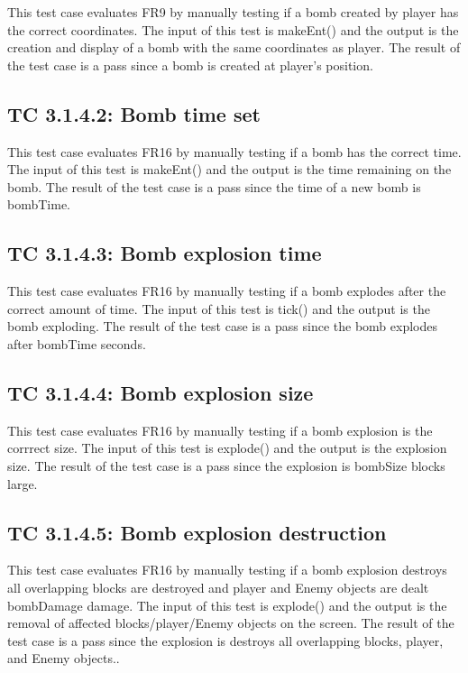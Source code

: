 \documentclass[12pt, titlepage]{article}
\begin{document}
This test case evaluates FR9 by manually testing if a bomb created by player has the correct coordinates. The input of this test is makeEnt() and the output is the creation and display of a bomb with the same coordinates as player. The result of the test case is a pass since a bomb is created at player's position. 

\subsection*{TC 3.1.4.2: Bomb time set}

This test case evaluates FR16 by manually testing if a bomb has the correct time. The input of this test is makeEnt() and the output is the time remaining on the bomb. The result of the test case is a pass since the time of a new bomb is bombTime. 

\subsection*{TC 3.1.4.3: Bomb explosion time}

This test case evaluates FR16 by manually testing if a bomb explodes after the correct amount of time. The input of this test is tick() and the output is the bomb exploding. The result of the test case is a pass since the bomb explodes after bombTime seconds. 

\subsection*{TC 3.1.4.4: Bomb explosion size}

This test case evaluates FR16 by manually testing if a bomb explosion is the corrrect size. The input of this test is explode() and the output is the explosion size. The result of the test case is a pass since the explosion is bombSize blocks large. 

\subsection*{TC 3.1.4.5: Bomb explosion destruction}

This test case evaluates FR16 by manually testing if a bomb explosion destroys all overlapping blocks are destroyed and player and Enemy objects are dealt bombDamage damage. The input of this test is explode() and the output is the removal of affected blocks/player/Enemy objects on the screen. The result of the test case is a pass since the explosion is destroys all overlapping blocks, player, and Enemy objects.. 
\end{document}
